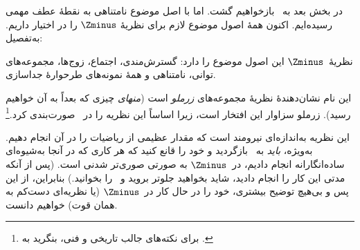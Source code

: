 \documentclass[../../../include/open-logic-section]{subfiles}
\begin{document}

در بخش بعد به~\stagesinf{} بازخواهیم گشت. اما با اصل موضوع نامتناهی به
نقطهٔ عطف مهمی رسیده‌ایم. اکنون همهٔ اصول موضوع لازم برای نظریهٔ
$\Zminus$ را در اختیار داریم. به‌تفصیل:

\begin{defn}
نظریهٔ~$\Zminus$ این اصول موضوع را دارد: گسترش‌مندی، اجتماع، زوج‌ها،
مجموعه‌های توانی، نامتناهی و همهٔ نمونه‌های طرحوارهٔ جداسازی.
\end{defn}

این نام نشان‌دهندهٔ نظریهٔ مجموعه‌های \emph{زرملو} است (\emph{منهای}
چیزی که بعداً به آن خواهیم رسید). زرملو سزاوار این افتخار است، زیرا
اساساً این نظریه را در~\citeyear{Zermelo1908Untersuchungen} صورت‌بندی
کرد.\footnote{برای نکته‌های جالب تاریخی و فنی، بنگرید به
\citet[Appendix A]{Potter2004}.}

این نظریه به‌اندازه‌ای نیرومند است که مقدار عظیمی از ریاضیات را در آن
انجام دهیم. به‌ویژه، \emph{باید} به~ بازگردید و خود
را قانع کنید که هر کاری که در آنجا به‌شیوه‌ای ساده‌انگارانه انجام دادیم،
در~$\Zminus$ به صورتی صوری‌تر شدنی است. (پس از آنکه مدتی این کار را انجام
دادید، شاید بخواهید جلوتر بروید و~
را بخوانید.) بنابراین، از این پس و بی‌هیچ توضیح بیشتری، خود را در حال کار
در~$\Zminus$ (یا نظریه‌ای دست‌کم به همان قوت) خواهیم دانست.
\end{document}
